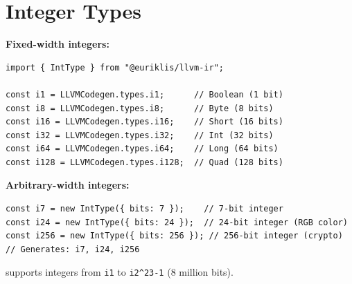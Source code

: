 \section{Integer Types}

\textbf{Fixed-width integers:}
\begin{lstlisting}[style=ts]
import { IntType } from "@euriklis/llvm-ir";

const i1 = LLVMCodegen.types.i1;      // Boolean (1 bit)
const i8 = LLVMCodegen.types.i8;      // Byte (8 bits)
const i16 = LLVMCodegen.types.i16;    // Short (16 bits)
const i32 = LLVMCodegen.types.i32;    // Int (32 bits)
const i64 = LLVMCodegen.types.i64;    // Long (64 bits)
const i128 = LLVMCodegen.types.i128;  // Quad (128 bits)
\end{lstlisting}

\textbf{Arbitrary-width integers:}
\begin{lstlisting}[style=ts]
const i7 = new IntType({ bits: 7 });    // 7-bit integer
const i24 = new IntType({ bits: 24 });  // 24-bit integer (RGB color)
const i256 = new IntType({ bits: 256 }); // 256-bit integer (crypto)
// Generates: i7, i24, i256
\end{lstlisting}

 supports integers from \texttt{i1} to \texttt{i2\^{}23-1} (8 million bits).

